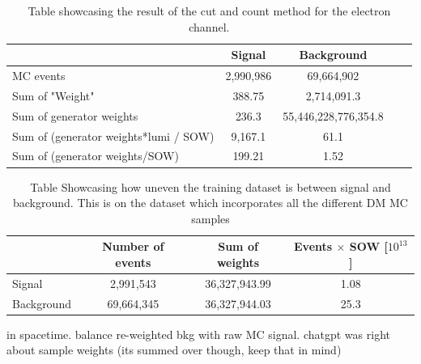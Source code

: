 \documentclass[14pt, a4paper]{book}
\begin{document}
\clearpage
\begin{table}[!h]
   \centering \caption[Cut and count significance ee]{Table showcasing the result of the cut and count method for the electron channel.}
   \begin{tabular}{l|c|c|c|r}\midrule\midrule
                                                & Signal     & Background \\\midrule
        MC events                               & 2,990,986  & 69,664,902 \\
        Sum of "Weight"                         & 388.75     & 2,714,091.3 \\
        Sum of generator weights                & 236.3      & 55,446,228,776,354.8 \\
        Sum of (generator weights*lumi / SOW)   & 9,167.1    & 61.1 \\
        Sum of (generator weights/SOW)          & 199.21    & 1.52 \\\midrule\midrule
   \end{tabular}
\end{table}

\begin{table}[!h]
    \centering
    \caption[Unbalanced DM training dataset]{Table Showcasing how uneven the training dataset is between signal and background. This is on the dataset which incorporates all the different DM MC samples}
    \begin{tabular}{l|c|c|c}\midrule\midrule
                    & Number of events & Sum of weights & Events $\times$ SOW [$10^{13}$]\\\midrule
         Signal     & 2,991,543        & 36,327,943.99  & 1.08\\
         Background & 69,664,345       & 36,327,944.03  & 25.3 \\ \midrule\midrule
    \end{tabular}
    \label{tab:UnbalancedDMTraining}
\end{table}
in spacetime.
balance re-weighted bkg with raw MC signal. chatgpt was right about sample weights (its summed over though, keep that in mind)
\clearpage


\appendix






\end{document}
